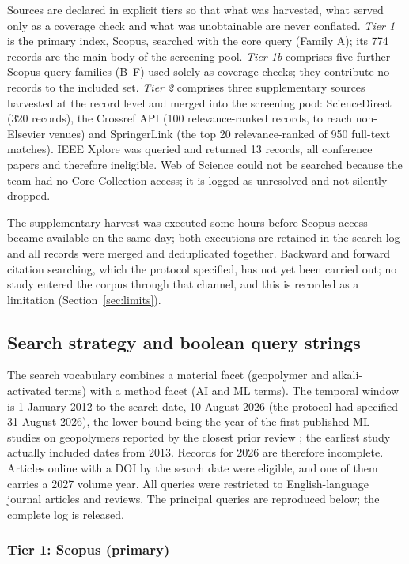 \documentclass[pdflatex,sn-basic]{sn-jnl}
\begin{document}
Sources are declared in explicit tiers so that what was harvested, what served only as a coverage check and what was unobtainable are never conflated. \emph{Tier 1} is the primary index, Scopus, searched with the core query (Family A); its 774 records are the main body of the screening pool. \emph{Tier 1b} comprises five further Scopus query families (B--F) used solely as coverage checks; they contribute no records to the included set. \emph{Tier 2} comprises three supplementary sources harvested at the record level and merged into the screening pool: ScienceDirect (320 records), the Crossref API (100 relevance-ranked records, to reach non-Elsevier venues) and SpringerLink (the top 20 relevance-ranked of 950 full-text matches). IEEE Xplore was queried and returned 13 records, all conference papers and therefore ineligible. Web of Science could not be searched because the team had no Core Collection access; it is logged as unresolved and not silently dropped.

The supplementary harvest was executed some hours before Scopus access became available on the same day; both executions are retained in the search log and all records were merged and deduplicated together. Backward and forward citation searching, which the protocol specified, has not yet been carried out; no study entered the corpus through that channel, and this is recorded as a limitation (Section~\ref{sec:limits}).

\subsection{Search strategy and boolean query strings}

The search vocabulary combines a material facet (geopolymer and alkali-activated terms) with a method facet (AI and ML terms). The temporal window is 1 January 2012 to the search date, 10 August 2026 (the protocol had specified 31 August 2026), the lower bound being the year of the first published ML studies on geopolymers reported by the closest prior review \citep{nguyen2025}; the earliest study actually included dates from 2013. Records for 2026 are therefore incomplete. Articles online with a DOI by the search date were eligible, and one of them carries a 2027 volume year. All queries were restricted to English-language journal articles and reviews. The principal queries are reproduced below; the complete log is released.

\subsubsection{Tier 1: Scopus (primary)}
\end{document}
